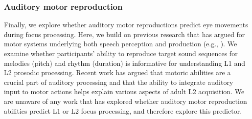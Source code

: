 \subsubsection{Auditory motor reproduction}
Finally, we explore whether auditory motor reproductions predict eye movements during focus processing. Here, we build on previous research that has argued for motor systems underlying both speech perception and production (e.g., \cite{liberman1985motor,hickok2011sensorimotor}). We examine whether participants' ability to reproduce target sound sequences for melodies (pitch) and rhythm (duration) is informative for understanding L1 and L2 prosodic processing. Recent work \citep{tierney2014auditory, saito2024auditory,tierney2017individual} has argued that motoric abilities are a crucial part of auditory processing and that the ability to integrate auditory input to motor actions helps explain various aspects of adult L2 acquisition. We are unaware of any work that has explored whether auditory motor reproduction abilities predict L1 or L2 focus processing, and therefore explore this predictor.

